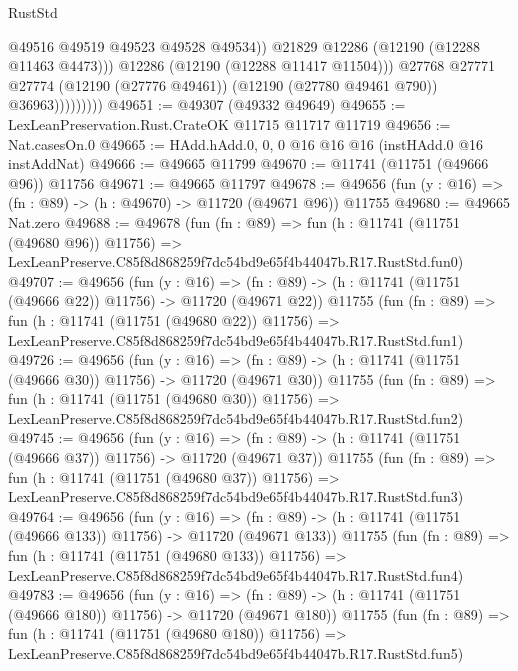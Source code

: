 \begin{lexlean}{RustStd}
\begin{coremodule}
                              @49516
                              @49519
                              @49523
                              @49528
                              @49534))
                          @21829
                          @12286
                          (@12190 (@12288 @11463 @4473)))
                        @12286
                        (@12190 (@12288 @11417 @11504)))
                      @27768
                      @27771
                      @27774
                      (@12190 (@27776 @49461))
                      (@12190 (@27780 @49461 @790))
                      @36963)))))))))
@49651 := @49307 (@49332 @49649)
@49655 := LexLeanPreservation.Rust.CrateOK @11715 @11717 @11719
@49656 := Nat.casesOn.{0}
@49665 := HAdd.hAdd.{0, 0, 0} @16 @16 @16 (instHAdd.{0} @16 instAddNat)
@49666 := @49665 @11799
@49670 := @11741 (@11751 (@49666 @96)) @11756
@49671 := @49665 @11797
@49678 := @49656 (fun (y : @16) => (fn : @89) -> (h : @49670) -> @11720 (@49671 @96)) @11755
@49680 := @49665 Nat.zero
@49688 := @49678
    (fun (fn : @89) =>
    fun (h : @11741 (@11751 (@49680 @96)) @11756) =>
    LexLeanPreserve.C85f8d868259f7dc54bd9e65f4b44047b.R17.RustStd.fun0)
@49707 := @49656
    (fun (y : @16) =>
    (fn : @89) -> (h : @11741 (@11751 (@49666 @22)) @11756) -> @11720 (@49671 @22))
    @11755
    (fun (fn : @89) =>
    fun (h : @11741 (@11751 (@49680 @22)) @11756) =>
    LexLeanPreserve.C85f8d868259f7dc54bd9e65f4b44047b.R17.RustStd.fun1)
@49726 := @49656
    (fun (y : @16) =>
    (fn : @89) -> (h : @11741 (@11751 (@49666 @30)) @11756) -> @11720 (@49671 @30))
    @11755
    (fun (fn : @89) =>
    fun (h : @11741 (@11751 (@49680 @30)) @11756) =>
    LexLeanPreserve.C85f8d868259f7dc54bd9e65f4b44047b.R17.RustStd.fun2)
@49745 := @49656
    (fun (y : @16) =>
    (fn : @89) -> (h : @11741 (@11751 (@49666 @37)) @11756) -> @11720 (@49671 @37))
    @11755
    (fun (fn : @89) =>
    fun (h : @11741 (@11751 (@49680 @37)) @11756) =>
    LexLeanPreserve.C85f8d868259f7dc54bd9e65f4b44047b.R17.RustStd.fun3)
@49764 := @49656
    (fun (y : @16) =>
    (fn : @89) -> (h : @11741 (@11751 (@49666 @133)) @11756) -> @11720 (@49671 @133))
    @11755
    (fun (fn : @89) =>
    fun (h : @11741 (@11751 (@49680 @133)) @11756) =>
    LexLeanPreserve.C85f8d868259f7dc54bd9e65f4b44047b.R17.RustStd.fun4)
@49783 := @49656
    (fun (y : @16) =>
    (fn : @89) -> (h : @11741 (@11751 (@49666 @180)) @11756) -> @11720 (@49671 @180))
    @11755
    (fun (fn : @89) =>
    fun (h : @11741 (@11751 (@49680 @180)) @11756) =>
    LexLeanPreserve.C85f8d868259f7dc54bd9e65f4b44047b.R17.RustStd.fun5)

\end{coremodule}
\end{lexlean}
